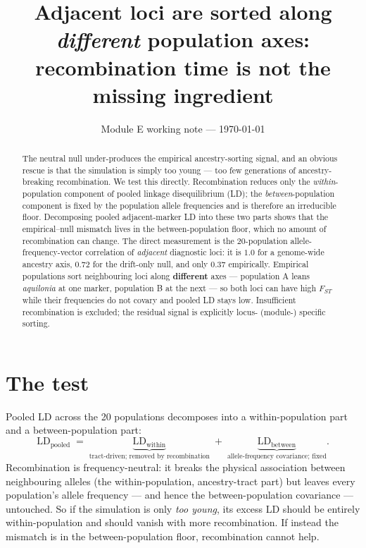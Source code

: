 \documentclass[11pt,a4paper]{article}
\title{Adjacent loci are sorted along \emph{different} population axes:
recombination time is not the missing ingredient}
\author{}
\date{Module E working note --- \today}
\begin{document}
\maketitle
\vspace{-2em}

\begin{abstract}\noindent
The neutral null under-produces the empirical ancestry-sorting signal, and an obvious
rescue is that the simulation is simply too young --- too few generations of
ancestry-breaking recombination. We test this directly. Recombination reduces only the
\emph{within}-population component of pooled linkage disequilibrium (LD); the
\emph{between}-population component is fixed by the population allele frequencies and is
therefore an irreducible floor. Decomposing pooled adjacent-marker LD into these two
parts shows that the empirical--null mismatch lives in the between-population floor,
which no amount of recombination can change. The direct measurement is the
20-population allele-frequency-vector correlation of \emph{adjacent} diagnostic loci: it
is $1.0$ for a genome-wide ancestry axis, $0.72$ for the drift-only null, and only
$0.37$ empirically. Empirical populations sort neighbouring loci along
\textbf{different} axes --- population A leans \textit{aquilonia} at one marker,
population B at the next --- so both loci can have high $F_{ST}$ while their frequencies
do not covary and pooled LD stays low. Insufficient recombination is excluded; the
residual signal is explicitly locus- (module-) specific sorting.
\end{abstract}

\section{The test}
Pooled LD across the 20 populations decomposes into a within-population part and a
between-population part:
\[
\mathrm{LD_{pooled}} \;=\; \underbrace{\mathrm{LD_{within}}}_{\text{tract-driven; removed by recombination}}
\;+\;\underbrace{\mathrm{LD_{between}}}_{\text{allele-frequency covariance; fixed}} .
\]
Recombination is frequency-neutral: it breaks the physical association between
neighbouring alleles (the within-population, ancestry-tract part) but leaves every
population's allele frequency --- and hence the between-population covariance ---
untouched. So if the simulation is only \emph{too young}, its excess LD should be
entirely within-population and should vanish with more recombination. If instead the
mismatch is in the between-population floor, recombination cannot help.
\end{document}
